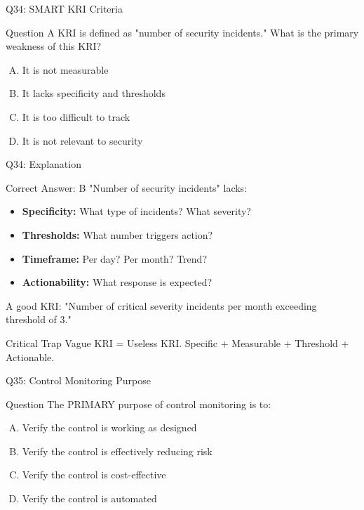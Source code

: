 \documentclass{beamer}
\begin{document}
	\begin{frame}{Q34: SMART KRI Criteria}
		\begin{block}{Question}
			A KRI is defined as "number of security incidents." What is the primary weakness of this KRI?
		\end{block}
		\begin{enumerate}[(A)]
			\item It is not measurable
			\item It lacks specificity and thresholds
			\item It is too difficult to track
			\item It is not relevant to security
		\end{enumerate}
	\end{frame}
	
	\begin{frame}{Q34: Explanation}
		\begin{block}{Correct Answer: B}
			"Number of security incidents" lacks:
			\begin{itemize}
				\item \textbf{Specificity:} What type of incidents? What severity?
				\item \textbf{Thresholds:} What number triggers action?
				\item \textbf{Timeframe:} Per day? Per month? Trend?
				\item \textbf{Actionability:} What response is expected?
			\end{itemize}
			A good KRI: "Number of critical severity incidents per month exceeding threshold of 3."
		\end{block}
		\begin{alertblock}{Critical Trap}
			Vague KRI = Useless KRI.
			Specific + Measurable + Threshold + Actionable.
		\end{alertblock}
	\end{frame}
	
	\begin{frame}{Q35: Control Monitoring Purpose}
		\begin{block}{Question}
			The PRIMARY purpose of control monitoring is to:
		\end{block}
		\begin{enumerate}[(A)]
			\item Verify the control is working as designed
			\item Verify the control is effectively reducing risk
			\item Verify the control is cost-effective
			\item Verify the control is automated
		\end{enumerate}
	\end{frame}
	
\end{document}
